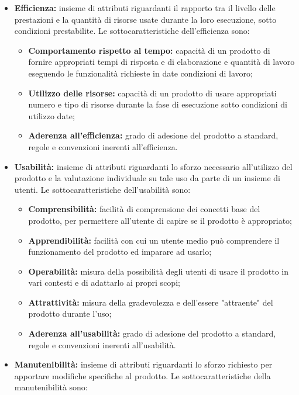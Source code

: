 \begin{itemize}
    \item \textbf{Efficienza:} insieme di attributi riguardanti il rapporto tra il livello delle prestazioni e la quantità di risorse usate durante la loro esecuzione, sotto condizioni prestabilite.
    Le sottocaratteristiche dell'efficienza sono:
    \begin{itemize}
        \item \textbf{Comportamento rispetto al tempo:} capacità di un prodotto di fornire appropriati tempi di risposta e di elaborazione e quantità di lavoro eseguendo le funzionalità richieste in date condizioni di lavoro;
        \item \textbf{Utilizzo delle risorse:} capacità di un prodotto di usare appropriati numero e tipo di risorse durante la fase di esecuzione sotto condizioni di utilizzo date;
        \item \textbf{Aderenza all'efficienza:} grado di adesione del prodotto a standard, regole e convenzioni inerenti all'efficienza.
    \end{itemize}
    \item \textbf{Usabilità:} insieme di attributi riguardanti lo sforzo necessario all'utilizzo del prodotto e la valutazione individuale su tale uso da parte di un insieme di utenti.
    Le sottocaratteristiche dell'usabilità sono:
    \begin{itemize}
        \item \textbf{Comprensibilità:} facilità di comprensione dei concetti base del prodotto, per permettere all'utente di capire se il prodotto è appropriato;
        \item \textbf{Apprendibilità:} facilità con cui un utente medio può comprendere il funzionamento del prodotto ed imparare ad usarlo;
        \item \textbf{Operabilità:} misura della possibilità degli utenti di usare il prodotto in vari contesti e di adattarlo ai propri scopi;
        \item \textbf{Attrattività:} misura della gradevolezza e dell'essere "attraente" del prodotto durante l'uso;
        \item \textbf{Aderenza all'usabilità:} grado di adesione del prodotto a standard, regole e convenzioni inerenti all'usabilità.
    \end{itemize}
    \item \textbf{Manutenibilità:} insieme di attributi riguardanti lo sforzo richiesto per apportare modifiche specifiche al prodotto.
    Le sottocaratteristiche della manutenibilità sono:
    \begin{itemize}

\end{itemize}
\end{itemize}
